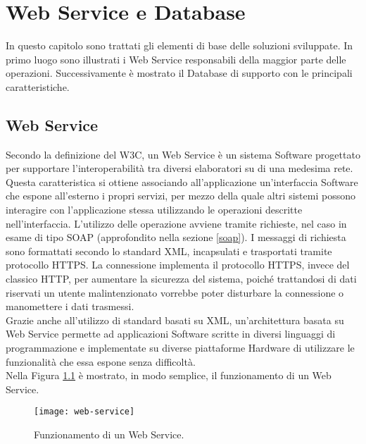 
\chapter{Web Service e Database}
\label{cap:sviluppo-software}

In questo capitolo sono trattati gli elementi di base delle soluzioni sviluppate. In primo luogo sono illustrati i Web Service responsabili della maggior parte delle operazioni. Successivamente è mostrato il Database di supporto con le principali caratteristiche.


\section{Web Service}

Secondo la definizione del \gls{W3C}, un Web Service è un sistema Software progettato per supportare l'interoperabilità tra diversi elaboratori su di una medesima rete.
Questa caratteristica si ottiene associando all'applicazione un'interfaccia Software che espone all'esterno i propri servizi, per mezzo della quale altri sistemi possono interagire con l'applicazione stessa utilizzando le operazioni descritte nell'interfaccia. L'utilizzo delle operazione avviene tramite richieste, nel caso in esame di tipo SOAP (approfondito nella sezione \ref{soap}). I messaggi di richiesta sono formattati secondo lo standard \gls{XML}, incapsulati e trasportati tramite protocollo HTTPS. 
La connessione implementa il protocollo HTTPS, invece del classico HTTP, per aumentare la sicurezza del sistema, poiché trattandosi di dati riservati un utente malintenzionato vorrebbe poter disturbare la connessione o manomettere i dati trasmessi.\\
Grazie anche all'utilizzo di standard basati su XML, un'architettura basata su Web Service permette ad applicazioni Software scritte in diversi linguaggi di programmazione e implementate su diverse piattaforme Hardware di utilizzare le funzionalità che essa espone senza difficoltà.
\\Nella Figura \ref{webservice} è mostrato, in modo semplice, il funzionamento di un Web Service.

\begin{figure}[!h] 
    \centering 
    \texttt{[image: web-service]} 
    \caption{Funzionamento di un Web Service.}
    \label{webservice}
\end{figure}


